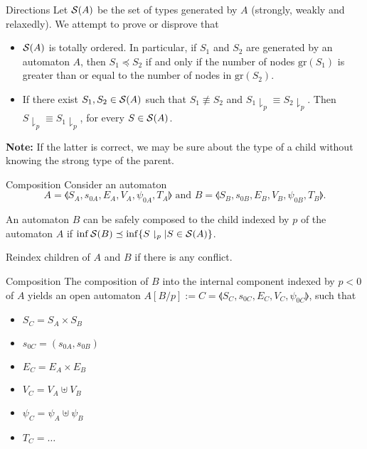 \begin{frame}{Directions}
  Let $\S(A)$ be the set of types generated by $A$ (strongly, weakly and relaxedly). We attempt to prove or disprove that
  \begin{itemize}
    \item $\S(A)$ is totally ordered. In particular, if $S_1$ and $S_2$ are generated by an automaton $A$, then $S_1\preceq S_2$ if and only if the number of nodes $\text{gr}(S_1)$ is greater than or equal to the number of nodes in $\text{gr}(S_2)$.
    \item If there exist $S_1,S_2\in\S(A)$ such that $S_1\not\equiv S_2$ and $S_1\downharpoonright_p \equiv S_2\downharpoonright_p$. Then $S\downharpoonright_p\equiv S_1\downharpoonright_p$, for every $S\in \S(A)$.
  \end{itemize}
  \textbf{Note:} If the latter is correct, we may be sure about the type of a child without knowing the strong type of the parent.
\end{frame}

\begin{frame}{Composition}
  Consider an automaton
  $$A=\llangle S_A, s_{0A}, E_A, V_A, \psi_{0A}, T_A\rrangle \text{ and } B=\llangle S_B, s_{0B}, E_B, V_B, \psi_{0B}, T_B\rrangle.$$

  An automaton $B$ can be safely composed to the child indexed by $p$ of the automaton $A$ if $\inf \S(B) \preceq \inf \{S\downharpoonright_p | S\in \S(A)\}$.

  Reindex children of $A$ and $B$ if there is any conflict.
\end{frame}

\begin{frame}{Composition}
  The composition of $B$ into the internal component indexed by $p<0$ of $A$ yields an open automaton $A[B/p]:=C=\llangle S_C, s_{0C}, E_C, V_C, \psi_{0C}\rrangle$, such that
  \begin{itemize}
    \item $S_C = S_A\times S_B$
    \item $s_{0C} = (s_{0A}, s_{0B})$
    \item $E_C = E_A\times E_B$
    \item $V_C = V_A\uplus V_B$
    \item $\psi_C = \psi_A\uplus \psi_B$
    \item $T_C = \ldots$
  \end{itemize}
\end{frame}

